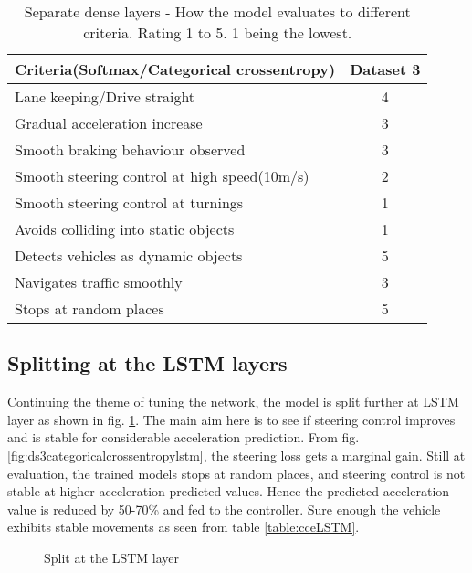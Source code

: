 \begin{table}[h]
    \centering
\begin{tabular}{lc}
    \toprule
    Criteria(Softmax/Categorical crossentropy) & Dataset 3 \\\midrule
    Lane keeping/Drive straight  & 4  \\
    Gradual acceleration increase  & 3 \\
    Smooth braking behaviour observed & 3 \\
    Smooth steering control at high speed(10m/s) & 2 \\
    Smooth steering control at turnings & 1\\
    Avoids colliding into static objects & 1 \\
    Detects vehicles as dynamic objects & 5 \\
    Navigates traffic smoothly & 3\\
    Stops at random places & 5 \\\bottomrule
\end{tabular}
\caption{Separate dense layers - How the model evaluates to different criteria. Rating 1
to 5. 1 being the lowest.}
\label{table:ccedense}
\end{table}
\newpage
\subsection{Splitting at the LSTM layers}
Continuing the theme of tuning the network, the model is split further at LSTM layer as shown in fig. \ref{fig:steeringlstmsplit}. The main aim here is to see if steering control improves and
is stable for considerable acceleration prediction. From fig. \ref{fig:ds3categoricalcrossentropylstm}, the steering loss gets a marginal gain. Still at
evaluation, the trained models stops at random places, and steering control is not stable at
higher acceleration predicted values. Hence the predicted acceleration value is reduced by
50-70\% and fed to the controller. Sure enough the vehicle exhibits stable movements as
seen from table \ref{table:cceLSTM}.

\begin{figure}[!ht]
	\centering
    \def\svgwidth{0.25\textwidth}
    \caption{Split at the LSTM layer}
    \label{fig:steeringlstmsplit}
\end{figure}

